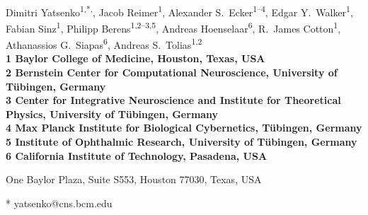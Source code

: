\documentclass[10pt,letterpaper]{article}
\date{}
\begin{document}
\vspace*{0.35in}

\begin{flushleft}
{\Large
\textbf{}
}
\newline
\\
Dimitri Yatsenko\textsuperscript{1,*,\ddag}, 
Jacob Reimer\textsuperscript{1}, 
Alexander S.~Ecker\textsuperscript{1--4}, 
Edgar Y.~Walker\textsuperscript{1},
Fabian Sinz\textsuperscript{1}, 
Philipp Berens\textsuperscript{1,2--3,5}, 
Andreas Hoenselaar\textsuperscript{6}, 
R.~James Cotton\textsuperscript{1}, 
Athanassios G.~Siapas\textsuperscript{6}, 
Andreas S.~Tolias\textsuperscript{1,2}
\\
\bigskip
\bf{1} Baylor College of Medicine, Houston, Texas, USA
\\
\bf{2} Bernstein Center for Computational Neuroscience, University of Tübingen, Germany
\\
\bf{3} Center for Integrative Neuroscience and Institute for Theoretical Physics, University of Tübingen, Germany
\\
\bf{4} Max Planck Institute for Biological Cybernetics, Tübingen, Germany
\\
\bf{5} Institute of Ophthalmic Research, University of Tübingen, Germany
\\
\bf{6} California Institute of Technology, Pasadena, USA
\\
\bigskip

% 
%


\ddag One Baylor Plaza, Suite S553, Houston 77030, Texas, USA



* yatsenko@cns.bcm.edu

\end{flushleft}
\end{document}
